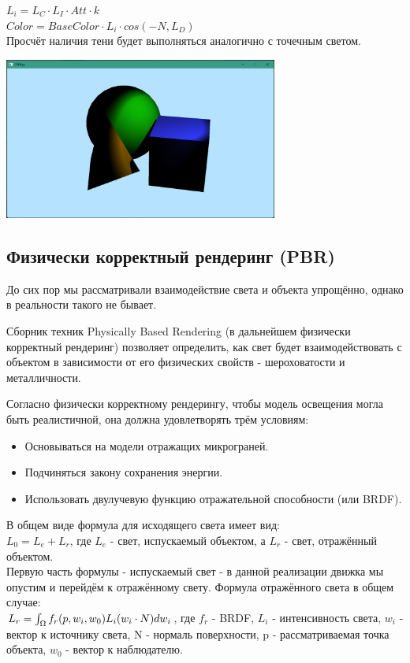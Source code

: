\documentclass[a4paper,14pt]{extarticle}
\newcommand\makenewfig[3] {
    \captionsetup{format=imagecaption}
    \begin{center}
        #1
        \nopagebreak
        \captionof{figure}{#2}
        \nopagebreak
        \label{#3}
    \end{center}
}
\begin{document}
$L_i = L_C \cdot L_I \cdot Att \cdot k$\\
$Color = BaseColor \cdot L_i \cdot cos(-N, L_D)$\\

Просчёт наличия тени будет выполняться аналогично с точечным светом.

\makenewfig{\includegraphics[width=90mm]{raytrace_6}}{Лампа}{ris:raytrace_6}

\subsection{Физически корректный рендеринг (PBR)}

До сих пор мы рассматривали взаимодействие света и 
объекта упрощённо, однако в реальности такого не бывает.

Сборник техник Physically Based Rendering (в дальнейшем физически корректный рендеринг) 
позволяет определить, как свет будет взаимодействовать с объектом в зависимости 
от его физических свойств - шероховатости и металличности.

Согласно физически корректному рендерингу, чтобы модель освещения могла быть реалистичной,
она должна удовлетворять трём условиям:
\begin{itemize}
    \item Основываться на модели отражащих микрограней.
    \item Подчиняться закону сохранения энергии.
    \item Использовать двулучевую функцию отражательной способности (или BRDF). 
\end{itemize}

В общем виде формула для исходящего света имеет вид:\\
$L_0 = L_e + L_r$, где $L_e$ - свет, испускаемый объектом, а $L_r$ - свет, отражённый объектом.\\
Первую часть формулы - испускаемый свет - в данной реализации движка мы опустим и перейдём к отражённому свету.
Формула отражённого света в общем случае:\\
$L_r = \int_{\Omega}^{} f_r(p, w_i, w_0) \space L_i \space (w_i \cdot N) dw_i$, где $f_r$ - BRDF, 
$L_i$ - интенсивность света, $w_i$ - вектор к источнику света, N - нормаль поверхности, p - рассматриваемая точка объекта, $w_0$ - вектор к наблюдателю.\\
\end{document}
